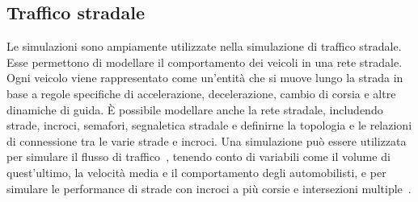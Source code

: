 \documentclass[12pt,a4paper,openright,twoside]{book}
\begin{document}
\subsection{Traffico stradale}
Le simulazioni sono ampiamente utilizzate nella simulazione di traffico stradale. Esse permettono di modellare il comportamento dei veicoli in una rete stradale. Ogni veicolo viene rappresentato come un'entità che si muove lungo la strada in base a regole specifiche di accelerazione, decelerazione, cambio di corsia e altre dinamiche di guida. È possibile modellare anche la rete stradale, includendo strade, incroci, semafori, segnaletica stradale e definirne la topologia e le relazioni di connessione tra le varie strade e incroci. 
Una simulazione può essere utilizzata per simulare il flusso di traffico~\cite{537860}, tenendo conto di variabili come il volume di quest'ultimo, la velocità media e il comportamento degli automobilisti, e per simulare le performance di strade con incroci a più corsie e intersezioni multiple~\cite{6606228}. 
\end{document}
